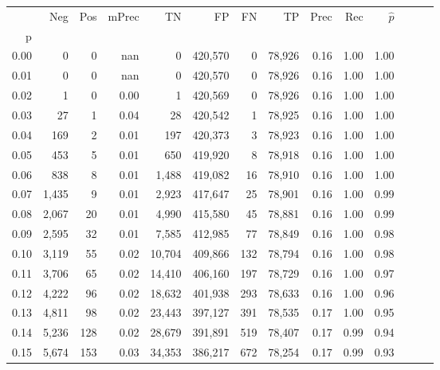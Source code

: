 \begin{tabular}{rrrrrrrrrrrrrr}
\toprule
{} &    Neg &    Pos & mPrec &       TN &       FP &      FN &      TP &  Prec &   Rec & $\hat{p}$ \\
p    &        &        &       &          &          &         &         &       &       &           \\
\midrule
0.00 &      0 &      0 &   nan &        0 &  420,570 &       0 &  78,926 &  0.16 &  1.00 &      1.00 \\
0.01 &      0 &      0 &   nan &        0 &  420,570 &       0 &  78,926 &  0.16 &  1.00 &      1.00 \\
0.02 &      1 &      0 &  0.00 &        1 &  420,569 &       0 &  78,926 &  0.16 &  1.00 &      1.00 \\
0.03 &     27 &      1 &  0.04 &       28 &  420,542 &       1 &  78,925 &  0.16 &  1.00 &      1.00 \\
0.04 &    169 &      2 &  0.01 &      197 &  420,373 &       3 &  78,923 &  0.16 &  1.00 &      1.00 \\
0.05 &    453 &      5 &  0.01 &      650 &  419,920 &       8 &  78,918 &  0.16 &  1.00 &      1.00 \\
0.06 &    838 &      8 &  0.01 &    1,488 &  419,082 &      16 &  78,910 &  0.16 &  1.00 &      1.00 \\
0.07 &  1,435 &      9 &  0.01 &    2,923 &  417,647 &      25 &  78,901 &  0.16 &  1.00 &      0.99 \\
0.08 &  2,067 &     20 &  0.01 &    4,990 &  415,580 &      45 &  78,881 &  0.16 &  1.00 &      0.99 \\
0.09 &  2,595 &     32 &  0.01 &    7,585 &  412,985 &      77 &  78,849 &  0.16 &  1.00 &      0.98 \\
0.10 &  3,119 &     55 &  0.02 &   10,704 &  409,866 &     132 &  78,794 &  0.16 &  1.00 &      0.98 \\
0.11 &  3,706 &     65 &  0.02 &   14,410 &  406,160 &     197 &  78,729 &  0.16 &  1.00 &      0.97 \\
0.12 &  4,222 &     96 &  0.02 &   18,632 &  401,938 &     293 &  78,633 &  0.16 &  1.00 &      0.96 \\
0.13 &  4,811 &     98 &  0.02 &   23,443 &  397,127 &     391 &  78,535 &  0.17 &  1.00 &      0.95 \\
0.14 &  5,236 &    128 &  0.02 &   28,679 &  391,891 &     519 &  78,407 &  0.17 &  0.99 &      0.94 \\
0.15 &  5,674 &    153 &  0.03 &   34,353 &  386,217 &     672 &  78,254 &  0.17 &  0.99 &      0.93 \\

\end{tabular}
